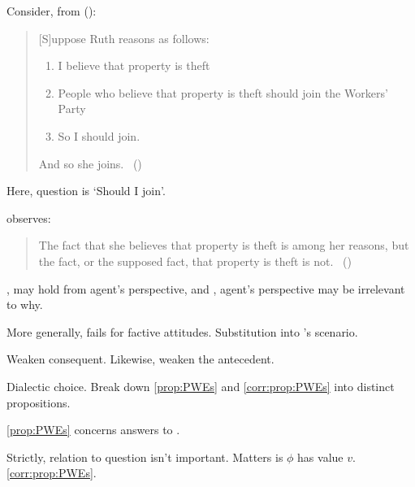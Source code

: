 \begin{note}
  Consider, from \citeauthor{Hyman:1999tm} (\citeyear{Hyman:1999tm}):

  \begin{quote}
    [S]uppose Ruth reasons as follows:

    \begin{enumerate}[label=, noitemsep]
    \item
      I believe that property is theft
    \item
      People who believe that property is theft should join the Workers’ Party
    \item
      So I should join.
    \end{enumerate}

    And so she joins.%
    \mbox{ }\hfill\mbox{(\citeyear[444]{Hyman:1999tm})}
  \end{quote}

  Here, question is `Should I join'.

  \citeauthor{Hyman:1999tm} observes:

  \begin{quote}
    The fact that she believes that property is theft is among her reasons, but the fact, or the supposed fact, that property is theft is not.%
    \mbox{ }\hfill\mbox{(\citeyear[444]{Hyman:1999tm})}
  \end{quote}
\end{note}

\begin{note}
  \citeauthor{Collins:1997wn}, may hold from agent's perspective, and \citeauthor{Hyman:1999tm}, agent's perspective may be irrelevant to why.
\end{note}

\begin{note}
  More generally, fails for factive attitudes.
  Substitution into \citeauthor{Hyman:1999tm}'s scenario.
\end{note}

\begin{note}
  Weaken consequent.
  Likewise, weaken the antecedent.
\end{note}

\begin{note}
  Dialectic choice.
  Break down \autoref{prop:PWEs} and \autoref{corr:prop:PWEs} into distinct propositions.

  \autoref{prop:PWEs} concerns answers to \qzS{}.
\end{note}

\begin{note}
  Strictly, relation to question isn't important.
  Matters is \(\phi\) has value \(v\).
  \autoref{corr:prop:PWEs}.
\end{note}

